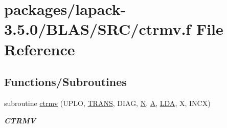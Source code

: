 \hypertarget{lapack-3_85_80_2BLAS_2SRC_2ctrmv_8f}{}\section{packages/lapack-\/3.5.0/\+B\+L\+A\+S/\+S\+R\+C/ctrmv.f File Reference}
\label{lapack-3_85_80_2BLAS_2SRC_2ctrmv_8f}
\subsection*{Functions/\+Subroutines}
\begin{DoxyCompactItemize}
\item 
subroutine \hyperlink{group__complex__blas__level2_ga62930e76219d094e424db1712a5356cb}{ctrmv} (U\+P\+L\+O, \hyperlink{superlu__enum__consts_8h_a0c4e17b2d5cea33f9991ccc6a6678d62a1f61e3015bfe0f0c2c3fda4c5a0cdf58}{T\+R\+A\+N\+S}, D\+I\+A\+G, \hyperlink{polmisc_8c_a0240ac851181b84ac374872dc5434ee4}{N}, \hyperlink{classA}{A}, \hyperlink{example__user_8c_ae946da542ce0db94dced19b2ecefd1aa}{L\+D\+A}, X, I\+N\+C\+X)
\begin{DoxyCompactList}\small\item\em {\bfseries C\+T\+R\+M\+V} \end{DoxyCompactList}\end{DoxyCompactItemize}
